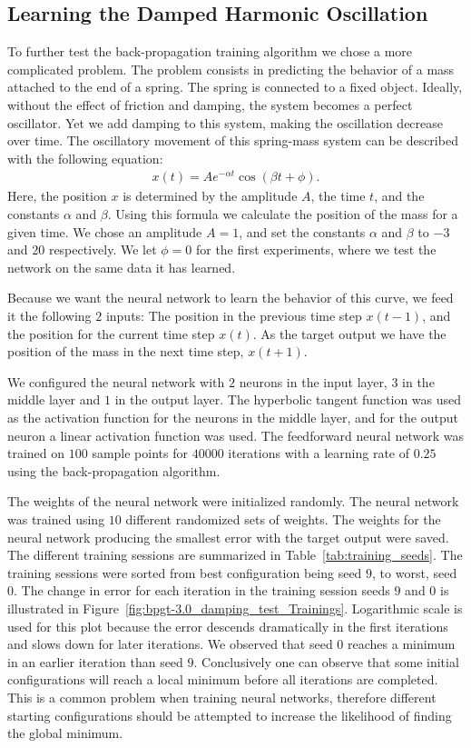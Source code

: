 \documentclass[11pt]{article}
\begin{document}
\subsection{Learning the Damped Harmonic Oscillation} %
\label{sub:a_more_complex_problem}
To further test the back-propagation training algorithm we chose a more complicated problem. The problem consists in predicting the
behavior of a mass attached to the end of a spring. The spring is connected to a fixed object. Ideally, without the effect of friction
and damping, the system becomes a perfect oscillator. Yet we add damping to this system, making the oscillation decrease over time. The
oscillatory movement of this spring-mass system can be described with the following equation:
\begin{eqnarray}\label{eqn:damping}
	x(t) = Ae^{-\alpha t}\cos{(\beta t+\phi)}.
\end{eqnarray}
Here, the position $x$ is determined by the amplitude $A$, the time $t$, and the constants $\alpha$ and $\beta$. Using this formula we
calculate the position of the mass for a given time. We chose an amplitude $A=1$, and set the constants $\alpha$ and $\beta$ to $-3$
and $20$ respectively. We let $\phi=0$ for the first experiments, where we test the network on the same data it has learned.

Because we want the neural network to learn the behavior of this curve, we feed it the following $2$ inputs: The position in the
previous time step $x(t-1)$, and the position for the current time step $x(t)$. As the target output we have the position of the mass in
the next time step, $x(t+1)$.

We configured the neural network with $2$ neurons in the input layer, $3$ in the middle layer and $1$ in the output layer. The
hyperbolic tangent function was used as the activation function for the neurons in the middle layer, and for the output neuron a linear
activation function was used. The feedforward neural network was trained on $100$ sample points for $40000$ iterations with a learning
rate of $0.25$ using the back-propagation algorithm.

The weights of the neural network were initialized randomly. The neural network was trained using $10$ different randomized sets of
weights. The weights for the neural network producing the smallest error with the target output were saved. The different training
sessions are summarized in Table~\ref{tab:training_seeds}. The training sessions were sorted from best configuration being seed $9$, to
worst, seed $0$. The change in error for each iteration in the training session seeds $9$ and $0$ is illustrated in
Figure~\ref{fig:bpgt-3.0_damping_test_Trainings}. Logarithmic scale is used for this plot because the error descends dramatically in the
first iterations and slows down for later iterations. We observed that seed $0$ reaches a minimum in an earlier iteration than seed $9$.
Conclusively one can observe that some initial configurations will reach a local minimum before all iterations are completed. This is a
common problem when training neural networks, therefore different starting configurations should be attempted to increase the likelihood
of finding the global minimum.
\end{document}
